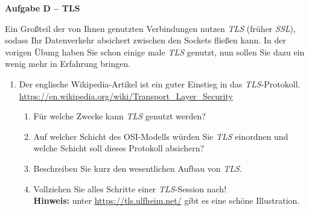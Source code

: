 \documentclass[paper=a4,fontsize=11pt]{scrartcl}%
\begin{document}
\begin{center}\Large{\textbf{Aufgabe D -- TLS}}\end{center}\vskip0.25in
Ein Großteil der von Ihnen genutzten Verbindungen nutzen \emph{TLS} (früher \emph{SSL}), sodass Ihr Datenverkehr absichert zwischen den Sockets fließen kann. In der vorigen Übung haben Sie schon einige male \emph{TLS} genutzt, nun sollen Sie dazu ein wenig mehr in Erfahrung bringen.
\begin{enumerate}
	\item Der englische Wikipedia-Artikel ist ein guter Einstieg in das \emph{TLS}-Protokoll.\\
	\url{https://en.wikipedia.org/wiki/Transport_Layer_Security}
	\begin{enumerate}
		\item Für welche Zwecke kann \emph{TLS} genutzt werden?
		\item Auf welcher Schicht des OSI-Modells würden Sie \emph{TLS} einordnen und welche Schicht soll dieses Protokoll absichern?
	\item Beschreiben Sie kurz den wesentlichen Aufbau von \emph{TLS}.
	\item Vollziehen Sie alles Schritte einer \emph{TLS}-Session nach!\\
	\textbf{Hinweis:} unter \url{https://tls.ulfheim.net/} gibt es eine schöne Illustration.
	\end{enumerate}
\end{enumerate}
\end{document}

